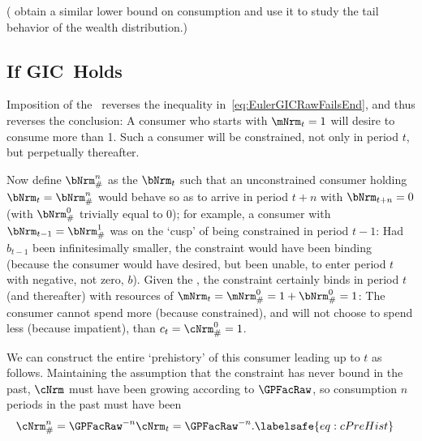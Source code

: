 \documentclass[\econtexRoot/BufferStockTheory]{subfiles}
\begin{document}
(\cite{StachurskiToda2019JET} obtain a similar lower bound on consumption and use it to study the tail behavior of the wealth distribution.)


\subsection{If {GIC}~Holds}

Imposition of the \GICRaw~reverses the inequality in~\eqref{eq:EulerGICRawFailsEnd}, and thus reverses the conclusion: A consumer who starts with $\mNrm_{t}=1$ will desire to consume more than 1.
Such a consumer will be constrained, not only in period $t$, but perpetually thereafter.

Now define $\bNrm_{\#}^{n}$ as the $\bNrm_{t}$ such that an unconstrained consumer holding $\bNrm_{t}=\bNrm_{\#}^{n}$ would behave so as to arrive in period $t+n$ with $\bNrm_{t+n}=0$ (with $\bNrm_{\#}^{0}$ trivially equal to 0); for example, a consumer with $\bNrm_{t-1}=\bNrm_{\#}^{1}$ was on the `cusp' of being constrained in period $t-1$: Had $b_{t-1}$ been infinitesimally smaller, the constraint would have been binding (because the consumer would have desired, but been unable, to enter period $t$ with negative, not zero, $b$).
Given
the \GICRaw, the constraint certainly binds in period $t$ (and thereafter) with resources of $\mNrm_{t}=\mNrm_{\#}^{0}=1+\bNrm_{\#}^{0}=1$: The consumer cannot spend more (because constrained), and will not choose to spend less (because impatient), than $c_{t}=\cNrm_{\#}^{0}=1$.

We can construct the entire `prehistory' of this consumer leading up to $t$ as follows.
Maintaining the assumption that the constraint has never bound in the past,
$\cNrm$ must have been growing according to $\GPFacRaw$, so consumption $n$ periods in the past must have been
\begin{equation}\begin{gathered}\begin{aligned}
  \cNrm_{\#}^{n}  & = \GPFacRaw^{-n} \cNrm_{t} = \GPFacRaw^{-n}. \labelsafe{eq:cPreHist}
\end{aligned}\end{gathered}\end{equation}
\end{document}
